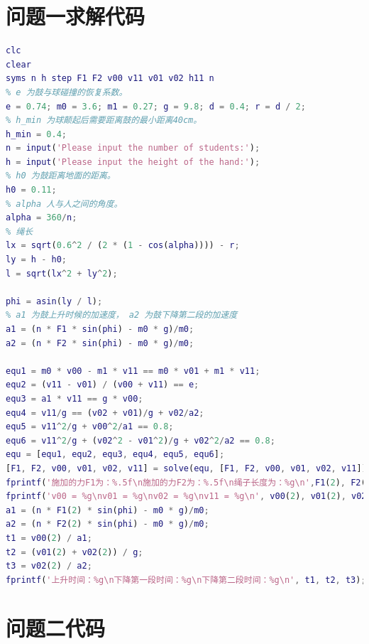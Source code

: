 \documentclass{cumcm}
\begin{document}
\section{问题一求解代码}
\begin{lstlisting}[language=matlab]
clc
clear
syms n h step F1 F2 v00 v11 v01 v02 h11 n
% e 为鼓与球碰撞的恢复系数。
e = 0.74; m0 = 3.6; m1 = 0.27; g = 9.8; d = 0.4; r = d / 2;
% h_min 为球颠起后需要距离鼓的最小距离40cm。
h_min = 0.4;
n = input('Please input the number of students:');
h = input('Please input the height of the hand:');
% h0 为鼓距离地面的距离。
h0 = 0.11;
% alpha 人与人之间的角度。
alpha = 360/n;
% 绳长
lx = sqrt(0.6^2 / (2 * (1 - cos(alpha)))) - r;
ly = h - h0;
l = sqrt(lx^2 + ly^2);

phi = asin(ly / l);
% a1 为鼓上升时候的加速度， a2 为鼓下降第二段的加速度
a1 = (n * F1 * sin(phi) - m0 * g)/m0;
a2 = (n * F2 * sin(phi) - m0 * g)/m0;

equ1 = m0 * v00 - m1 * v11 == m0 * v01 + m1 * v11;
equ2 = (v11 - v01) / (v00 + v11) == e;
equ3 = a1 * v11 == g * v00;
equ4 = v11/g == (v02 + v01)/g + v02/a2;
equ5 = v11^2/g + v00^2/a1 == 0.8;
equ6 = v11^2/g + (v02^2 - v01^2)/g + v02^2/a2 == 0.8;
equ = [equ1, equ2, equ3, equ4, equ5, equ6];
[F1, F2, v00, v01, v02, v11] = solve(equ, [F1, F2, v00, v01, v02, v11]);
fprintf('施加的力F1为：%.5f\n施加的力F2为：%.5f\n绳子长度为：%g\n',F1(2), F2(2), l);
fprintf('v00 = %g\nv01 = %g\nv02 = %g\nv11 = %g\n', v00(2), v01(2), v02(2), v11(2));
a1 = (n * F1(2) * sin(phi) - m0 * g)/m0;
a2 = (n * F2(2) * sin(phi) - m0 * g)/m0;
t1 = v00(2) / a1;
t2 = (v01(2) + v02(2)) / g;
t3 = v02(2) / a2;
fprintf('上升时间：%g\n下降第一段时间：%g\n下降第二段时间：%g\n', t1, t2, t3);

\end{lstlisting}

\section{问题二代码}
\end{document}
